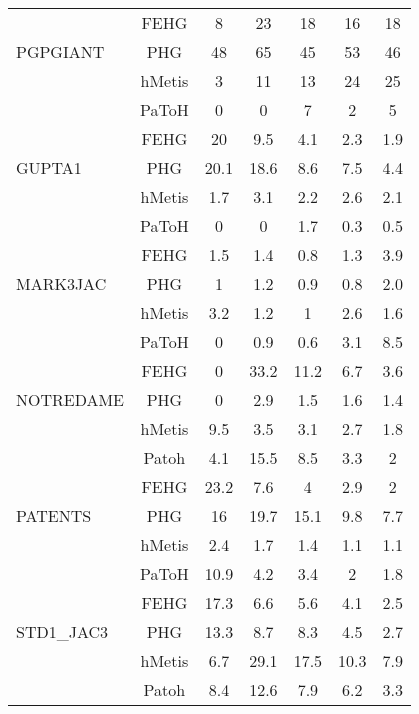 \documentclass[twocolumn]{svjour3}          \smartqed
\begin{document}
\begin{table}[ht]
{\begin{threeparttable}
\begin{tabular}{|l|c|ccccc|}
& FEHG	& 8 & 23 & 18 & 16 & 18 \\
PGPGIANT
			& PHG	& 48 & 65 & 45 & 53 & 46 \\
			& hMetis& 3 & 11 & 13 & 24 & 25 \\
			& PaToH	& 0 & 0 & 7 & 2 & 5\\
			\hline

& FEHG	& 20 & 9.5 & 4.1 & 2.3 & 1.9 \\
GUPTA1
			& PHG	& 20.1 & 18.6 & 8.6 & 7.5 & 4.4 \\
			& hMetis	& 1.7 & 3.1 & 2.2 & 2.6 & 2.1 \\
			& PaToH	& 0 & 0 & 1.7 & 0.3 & 0.5 \\
			\hline

& FEHG	& 1.5 & 1.4 & 0.8 & 1.3 & 3.9 \\
MARK3JAC
			& PHG	& 1 & 1.2 & 0.9 & 0.8 & 2.0 \\
			& hMetis& 3.2 & 1.2 & 1 & 2.6 & 1.6 \\
			& PaToH	& 0 & 0.9 & 0.6 & 3.1 & 8.5 \\
			\hline

& FEHG	& 0 & 33.2 & 11.2 & 6.7 & 3.6 \\
NOTREDAME
			& PHG	& 0 & 2.9 & 1.5 & 1.6 & 1.4 \\
			& hMetis	& 9.5 & 3.5 & 3.1 & 2.7 & 1.8 \\
			& Patoh	& 4.1 & 15.5 & 8.5 & 3.3 & 2 \\
			\hline

& FEHG	& 23.2 & 7.6 & 4 & 2.9 & 2 \\
PATENTS
			& PHG	& 16 & 19.7 & 15.1 & 9.8 & 7.7 \\
			& hMetis	& 2.4 & 1.7 & 1.4 & 1.1 & 1.1 \\
			& PaToH	& 10.9 & 4.2 & 3.4 & 2 & 1.8 \\
			\hline

& FEHG	& 17.3 & 6.6 & 5.6 & 4.1 & 2.5 \\
STD1\_JAC3
			& PHG	& 13.3 & 8.7 & 8.3 & 4.5 & 2.7 \\
			& hMetis	& 6.7 & 29.1 & 17.5 & 10.3 & 7.9 \\
			& Patoh	& 8.4 & 12.6 & 7.9 & 6.2 & 3.3 \\

			\hline
		\end{tabular}
	\end{threeparttable}
	}	\end{table}
\end{document}
